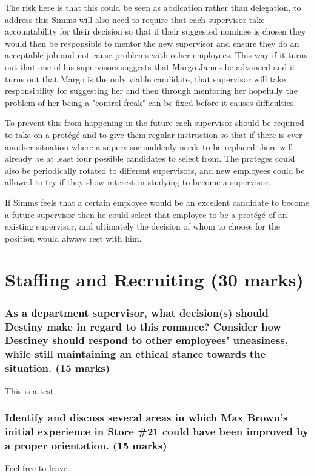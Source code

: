 \documentclass[letterpaper,12pt,titlepage]{article}
\begin{document}
The risk here is that this could be seen as abdication rather than delegation, to address this Simms will also need to require that each supervisor take accountability for their decision so that if their suggested nominee is chosen they would then be responsible to mentor the new supervisor and ensure they do an acceptable job and not cause problems with other employees. This way if it turns out that one of his supervisors suggests that Margo James be advanced and it turns out that Margo is the only viable candidate, that supervisor will take responsibility for suggesting her and then through mentoring her hopefully the problem of her being a "control freak" can be fixed before it causes difficulties.  

To prevent this from happening in the future each supervisor should be required to take on a protégé and to give them regular instruction so that if there is ever another situation where a supervisor suddenly needs to be replaced there will already be at least four possible candidates to select from. The proteges could also be periodically rotated to different supervisors, and new employees could be allowed to try if they show interest in studying to become a supervisor. 

If Simms feels that a certain employee would be an excellent candidate to become a future supervisor then he could select that employee to be a protégé of an existing supervisor, and ultimately the decision of whom to choose for the position would always rest with him. 

\part{Staffing and Recruiting (30 marks)}
\setcounter{section}{0}

\section{As a department supervisor, what decision(s) should Destiny make in regard to this romance? Consider how Destiney should respond to other employees' uneasiness, while still maintaining an ethical stance towards the situation. (15 marks)}

This is a test. 

\section{Identify and discuss several areas in which Max Brown's initial experience in Store \#21 could have been improved by a proper orientation. (15 marks)}

Feel free to leave.
\end{document}
